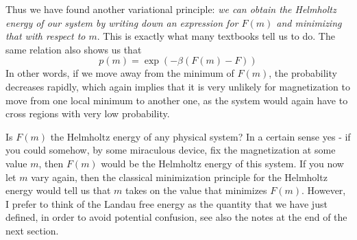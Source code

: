 \documentclass[a4paper, draft]{article}
\theoremstyle{own}
\theoremstyle{remark}
\begin{document}
Thus we have found another variational principle: {\em we can obtain the Helmholtz energy of our system by writing down an expression for $F(m)$ and minimizing that with respect to $m$}. This is exactly what many textbooks tell us to do. The same relation also shows us that 
$$
p(m) = \exp(-\beta(F(m) - F))
$$
In other words, if we move away from the minimum of $F(m)$, the probability decreases rapidly, which again implies that it is very unlikely for magnetization to move from one local minimum to another one, as the system would again have to cross regions with very low probability. 

Is $F(m)$ the Helmholtz energy of any physical system? In a certain sense yes - if you could somehow, by some miraculous device, fix the magnetization at some value $m$, then $F(m)$ would be the Helmholtz energy of this system. If you now let $m$ vary again, then the classical minimization principle for the Helmholtz energy would tell us that $m$ takes on the value that minimizes $F(m)$. However, I prefer to think of the Landau free energy as the quantity that we have just defined, in order to avoid potential confusion, see also the notes at the end of the next section. 
\end{document}
